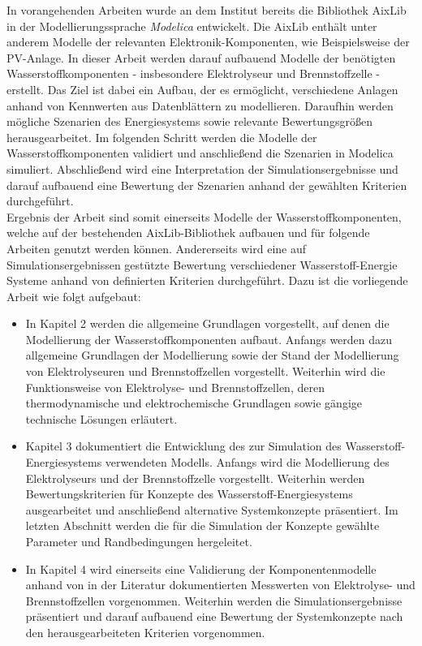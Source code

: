 In vorangehenden Arbeiten wurde an dem Institut bereits die Bibliothek AixLib in der Modellierungssprache \textit{Modelica} entwickelt. Die AixLib enthält unter anderem Modelle der relevanten Elektronik-Komponenten, wie Beispielsweise der PV-Anlage. In dieser Arbeit werden darauf aufbauend Modelle der benötigten Wasserstoffkomponenten - insbesondere Elektrolyseur und Brennstoffzelle - erstellt. Das Ziel ist dabei ein Aufbau, der es ermöglicht, verschiedene Anlagen anhand von Kennwerten aus Datenblättern zu modellieren. Daraufhin werden mögliche Szenarien des Energiesystems sowie relevante Bewertungsgrößen herausgearbeitet. Im folgenden Schritt werden die Modelle der Wasserstoffkomponenten validiert und anschließend die Szenarien in Modelica simuliert. Abschließend wird eine Interpretation der Simulationsergebnisse und darauf aufbauend eine Bewertung der Szenarien anhand der gewählten Kriterien durchgeführt.\\

Ergebnis der Arbeit sind somit einerseits Modelle der Wasserstoffkomponenten, welche auf der bestehenden AixLib-Bibliothek aufbauen und für folgende Arbeiten genutzt werden können. Andererseits wird eine auf Simulationsergebnissen gestützte Bewertung verschiedener Wasserstoff-Energie Systeme anhand von definierten Kriterien durchgeführt. Dazu ist die vorliegende Arbeit wie folgt aufgebaut:

\begin{itemize}
\item In Kapitel 2 werden die allgemeine Grundlagen vorgestellt, auf denen die Modellierung der Wasserstoffkomponenten aufbaut. Anfangs werden dazu allgemeine Grundlagen der Modellierung sowie der Stand der Modellierung von Elektrolyseuren und Brennstoffzellen vorgestellt. Weiterhin wird die Funktionsweise von Elektrolyse- und Brennstoffzellen, deren thermodynamische und elektrochemische Grundlagen sowie gängige technische Lösungen erläutert.
\item Kapitel 3 dokumentiert die Entwicklung des zur Simulation des Wasserstoff-Energiesystems verwendeten Modells. Anfangs wird die Modellierung des Elektrolyseurs und der Brennstoffzelle vorgestellt. Weiterhin werden Bewertungskriterien für Konzepte des Wasserstoff-Energiesystems ausgearbeitet und anschließend alternative Systemkonzepte präsentiert. Im letzten Abschnitt werden die für die Simulation der Konzepte gewählte Parameter und Randbedingungen hergeleitet.
\item In Kapitel 4 wird einerseits eine Validierung der Komponentenmodelle anhand von in der Literatur dokumentierten Messwerten von Elektrolyse- und Brennstoffzellen vorgenommen. Weiterhin werden die Simulationsergebnisse präsentiert und darauf aufbauend eine Bewertung der Systemkonzepte nach den herausgearbeiteten Kriterien vorgenommen.
\end{itemize}